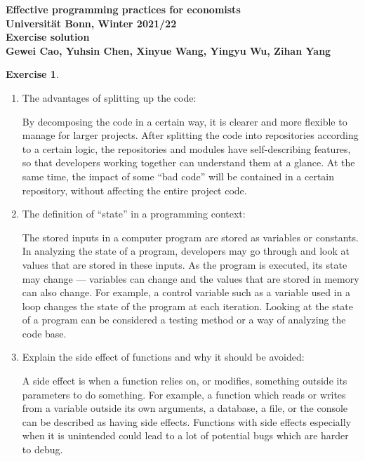 \documentclass[11pt,a4paper,leqno]{article}
\theoremstyle{definition}
\newtheorem{exercise}{Exercise}
\begin{document}
\begin{center}
    \begin{large}
        \textbf{
            Effective programming practices for economists\\
            Universität Bonn, Winter 2021/22 \\[2ex]
            Exercise solution\\[2ex]
            Gewei Cao, Yuhsin Chen, Xinyue Wang, Yingyu Wu, Zihan Yang
        }
    \end{large}
\end{center}


\begin{exercise}
    ~ %
    \begin{enumerate}
        \item The advantages of splitting up the code:\par
        By decomposing the code in a certain way, it is clearer and more flexible to manage for larger projects.
After splitting the code into repositories according to a certain logic, the repositories and modules have self-describing features, so that developers working together can understand them at a glance. At the same time, the impact of some “bad code” will be contained in a certain repository, without affecting the entire project code.
        \item  The definition of “state” in a programming context:\par
        The stored inputs in a computer program are stored as variables or constants. In analyzing the state of a program, developers may go through and look at values that are stored in these inputs. As the program is executed, its state may change — variables can change and the values that are stored in memory can also change. For example, a control variable such as a variable used in a loop changes the state of the program at each iteration. Looking at the state of a program can be considered a testing method or a way of analyzing the code base.
        \item Explain the side effect of functions and why it should be avoided:\par
        A side effect is when a function relies on, or modifies, something outside its parameters to do something. For example, a function which reads or writes from a variable outside its own arguments, a database, a file, or the console can be described as having side effects. Functions with side effects especially when it is unintended could lead to a lot of potential bugs which are harder to debug.\par

\end{enumerate}
\end{exercise}
\end{document}
